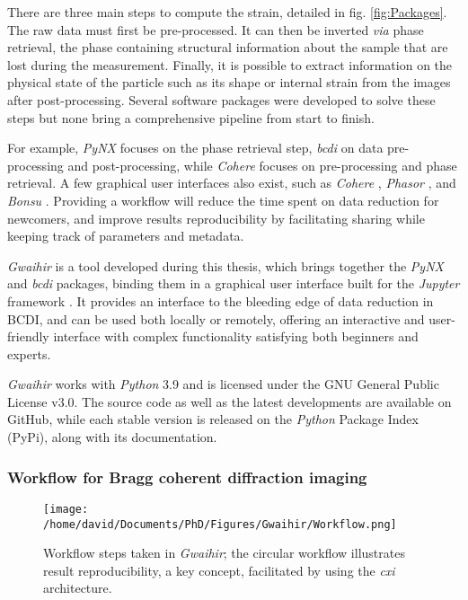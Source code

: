 There are three main steps to compute the strain, detailed in fig. \ref{fig:Packages}.
The raw data must first be pre-processed.
It can then be inverted \textit{via} phase retrieval, the phase containing structural information about the sample that are lost during the measurement.
Finally, it is possible to extract information on the physical state of the particle such as its shape or internal strain from the images after post-processing.
Several software packages were developed to solve these steps but none bring a comprehensive pipeline from start to finish.

For example, \textit{PyNX} \parencite{FavreNicolin2011} focuses on the phase retrieval step, \textit{bcdi} \parencite{Carnis2021c} on data pre-processing and post-processing, while \textit{Cohere} \parencite{Frosik2021} focuses on pre-processing and phase retrieval.
A few graphical user interfaces also exist, such as \textit{Cohere} \parencite{Frosik2021}, \textit{Phasor} \parencite{Dzhigaev2021}, and \textit{Bonsu} \parencite{Newton2012}.
Providing a workflow will reduce the time spent on data reduction for newcomers, and improve results reproducibility by facilitating sharing while keeping track of parameters and metadata.

\textit{Gwaihir} is a tool developed during this thesis, which brings together the \textit{PyNX} and \textit{bcdi} packages, binding them in a graphical user interface built for the \textit{Jupyter} framework \parencite{Kluyver2016}.
It provides an interface to the bleeding edge of data reduction in BCDI, and can be used both locally or remotely, offering an interactive and user-friendly interface with complex functionality satisfying both beginners and experts.

\textit{Gwaihir} works with \textit{Python} 3.9 and is licensed under the GNU General Public License v3.0.
The source code as well as the latest developments are available on GitHub, while each stable version is released on the \textit{Python} Package Index (PyPi), along with its documentation.

\subsubsection{Workflow for Bragg coherent diffraction imaging} \label{sec:Workflow}

\begin{figure}[!htb]
    \centering
    \texttt{[image: /home/david/Documents/PhD/Figures/Gwaihir/Workflow.png]}
    \caption{Workflow steps taken in \textit{Gwaihir}; the circular workflow illustrates result reproducibility, a key concept, facilitated by using the \textit{cxi} architecture.}
    \label{fig:Workflow}
\end{figure}

